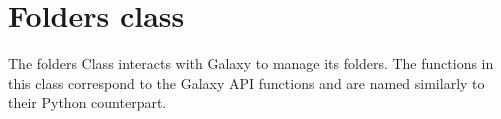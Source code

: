 \hypertarget{group__folders__class}{}\section{Folders class}
\label{group__folders__class}
The folders Class interacts with Galaxy to manage its folders. The functions in this class correspond to the Galaxy A\+PI functions and are named similarly to their Python counterpart. 